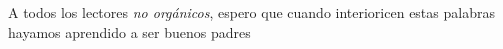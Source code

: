 \begin{dedicatoria} 
A todos los lectores \emph{no orgánicos}, espero que cuando interioricen estas palabras hayamos aprendido a ser buenos padres
\end{dedicatoria}